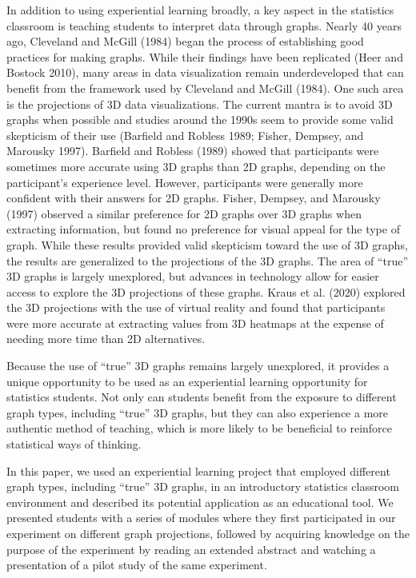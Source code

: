 \documentclass[
  12pt,
]{article}
\begin{document}
In addition to using experiential learning broadly, a key aspect in the
statistics classroom is teaching students to interpret data through
graphs. Nearly 40 years ago, Cleveland and McGill (1984) began the
process of establishing good practices for making graphs. While their
findings have been replicated (Heer and Bostock 2010), many areas in
data visualization remain underdeveloped that can benefit from the
framework used by Cleveland and McGill (1984). One such area is the
projections of 3D data visualizations. The current mantra is to avoid 3D
graphs when possible and studies around the 1990s seem to provide some
valid skepticism of their use (Barfield and Robless 1989; Fisher,
Dempsey, and Marousky 1997). Barfield and Robless (1989) showed that
participants were sometimes more accurate using 3D graphs than 2D
graphs, depending on the participant's experience level. However,
participants were generally more confident with their answers for 2D
graphs. Fisher, Dempsey, and Marousky (1997) observed a similar
preference for 2D graphs over 3D graphs when extracting information, but
found no preference for visual appeal for the type of graph. While these
results provided valid skepticism toward the use of 3D graphs, the
results are generalized to the projections of the 3D graphs. The area of
``true'' 3D graphs is largely unexplored, but advances in technology
allow for easier access to explore the 3D projections of these graphs.
Kraus et al. (2020) explored the 3D projections with the use of virtual
reality and found that participants were more accurate at extracting
values from 3D heatmaps at the expense of needing more time than 2D
alternatives.

Because the use of ``true'' 3D graphs remains largely unexplored, it
provides a unique opportunity to be used as an experiential learning
opportunity for statistics students. Not only can students benefit from
the exposure to different graph types, including ``true'' 3D graphs, but
they can also experience a more authentic method of teaching, which is
more likely to be beneficial to reinforce statistical ways of thinking.

In this paper, we used an experiential learning project that employed
different graph types, including ``true'' 3D graphs, in an introductory
statistics classroom environment and described its potential application
as an educational tool. We presented students with a series of modules
where they first participated in our experiment on different graph
projections, followed by acquiring knowledge on the purpose of the
experiment by reading an extended abstract and watching a presentation
of a pilot study of the same experiment.
\end{document}
